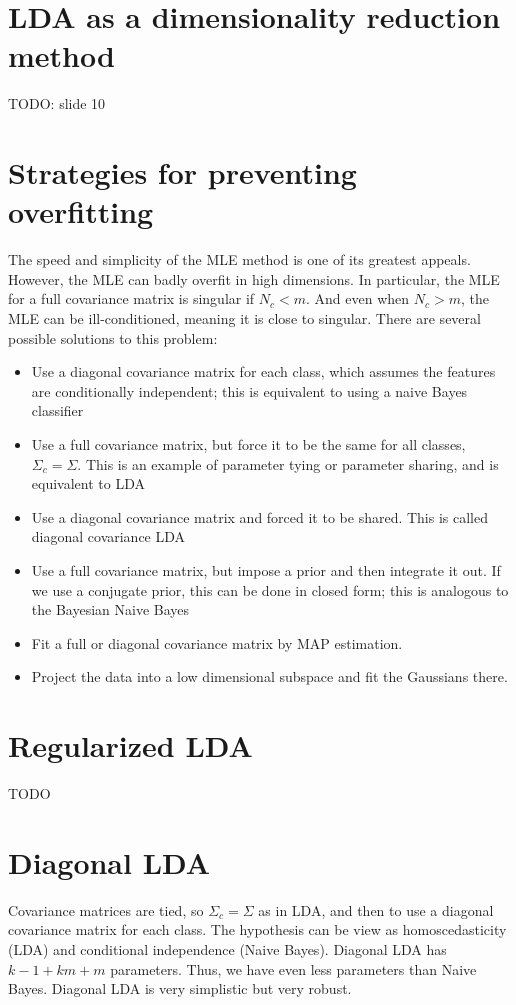 \documentclass[12pt, a4paper]{article}
\theoremstyle{definition}
\numberwithin{figure}{section}
\numberwithin{equation}{section}
\numberwithin{table}{section}
\begin{document}
\section{LDA as a dimensionality reduction method}
TODO: slide 10

\section{Strategies for preventing overﬁtting}
The speed and simplicity of the MLE method is one of its greatest appeals. However, the MLE can badly overﬁt in high dimensions. In particular, the MLE for a full covariance matrix is singular if $N_c < m$. And even when $N_c > m$, the MLE can be ill-conditioned, meaning it is close to singular. There are several possible solutions to this problem:
\begin{itemize}
\item Use a diagonal covariance matrix for each class, which assumes the features are conditionally independent; this is equivalent to using a naive Bayes classifier
\item Use a full covariance matrix, but force it to be the same for all classes, $\Sigma_c=\Sigma$. This is an example of parameter tying or parameter sharing, and is equivalent to LDA
\item Use a diagonal covariance matrix and forced it to be shared. This is called diagonal covariance LDA
\item Use a full covariance matrix, but impose a prior and then integrate it out. If we use a conjugate prior, this can be done in closed form; this is analogous to the Bayesian Naive Bayes
\item Fit a full or diagonal covariance matrix by MAP estimation.
\item Project the data into a low dimensional subspace and ﬁt the Gaussians there.
\end{itemize}

\section{Regularized LDA}
TODO

\section{Diagonal LDA}
Covariance matrices are tied, so $\Sigma_c=\Sigma$ as in LDA, and then to use a diagonal covariance matrix for each class. The hypothesis can be view as homoscedasticity (LDA) and conditional independence (Naive Bayes). Diagonal LDA has $k-1+km+m$ parameters. Thus, we have even less parameters than Naive Bayes. Diagonal LDA is very simplistic but very robust.
\end{document}
